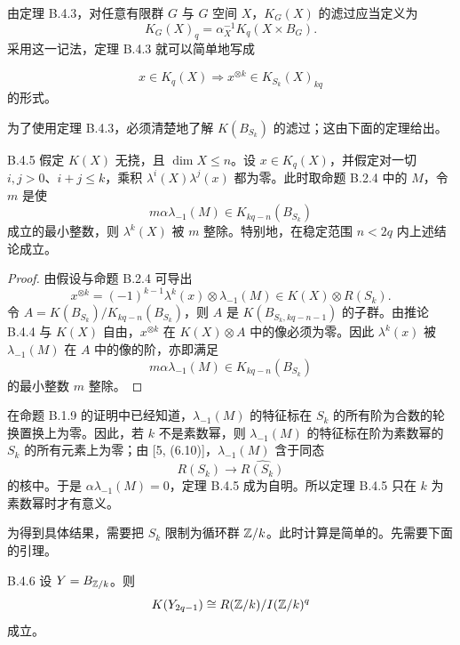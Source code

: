 \begin{remark}{}
  由定理 B.4.3，对任意有限群 $G$ 与 $G$ 空间 $X$，$K_G(X)$ 的滤过应当定义为
  \[
    K_G(X)_q=\alpha_X^{-1}K_q(X\times B_G).
  \]
  采用这一记法，定理 B.4.3 就可以简单地写成

  \[
    x\in K_q(X)\Rightarrow x^{\otimes k}\in K_{S_k}(X)_{kq}
  \]
  的形式。
\end{remark}

为了使用定理 B.4.3，必须清楚地了解 $K(B_{S_k})$ 的滤过；这由下面的定理给出。

\begin{theorem*}{B.4.5}
  假定 $K(X)$ 无挠，且 $\dim X\le n$。设 $x\in K_q(X)$，并假定对一切 $i,j>0$、$i+j\le k$，乘积 $\lambda^i(X)\lambda^j(x)$ 都为零。此时取命题 B.2.4 中的 $M$，令 $m$ 是使
  \[
    m\alpha\lambda_{-1}(M)\in K_{kq-n}(B_{S_k})
  \]
  成立的最小整数，则 $\lambda^k(X)$ 被 $m$ 整除。特别地，在稳定范围 $n<2q$ 内上述结论成立。
\end{theorem*}


\begin{proof}
  由假设与命题 B.2.4 可导出
  \[
    x^{\otimes k}=(-1)^{k-1}\lambda^k(x)\otimes\lambda_{-1}(M)\in K(X)\otimes R(S_k).
  \]
  令 $A=K(B_{S_k})/K_{kq-n}(B_{S_k})$，则 $A$ 是 $K(B_{S_k,kq-n-1})$ 的子群。由推论 B.4.4 与 $K(X)$ 自由，$x^{\otimes k}$ 在 $K(X)\otimes A$ 中的像必须为零。因此 $\lambda^k(x)$ 被 $\lambda_{-1}(M)$ 在 $A$ 中的像的阶，亦即满足
  \[
    m\alpha\lambda_{-1}(M)\in K_{kq-n}(B_{S_k})
  \]
  的最小整数 $m$ 整除。
\end{proof}

\begin{remark}{}
  在命题 B.1.9 的证明中已经知道，$\lambda_{-1}(M)$ 的特征标在 $S_k$ 的所有阶为合数的轮换置换上为零。因此，若 $k$ 不是素数幂，则 $\lambda_{-1}(M)$ 的特征标在阶为素数幂的 $S_k$ 的所有元素上为零；由 [5, (6.10)]，$\lambda_{-1}(M)$ 含于同态
  \[
    R(S_k)\to\widehat{R(S_k)}
  \]
  的核中。于是 $\alpha\lambda_{-1}(M)=0$，定理 B.4.5 成为自明。所以定理 B.4.5 只在 $k$ 为素数幂时才有意义。
\end{remark}

为得到具体结果，需要把 $S_k$ 限制为循环群 $\mathbb{Z}/k$。此时计算是简单的。先需要下面的引理。

\begin{lemma*}{B.4.6}
  设 $Y=B_{\mathbb{Z}/k}$。则
  \[
    K(Y_{2q-1})\cong R(\mathbb{Z}/k)/I(\mathbb{Z}/k)^q
  \]
  成立。
\end{lemma*}

